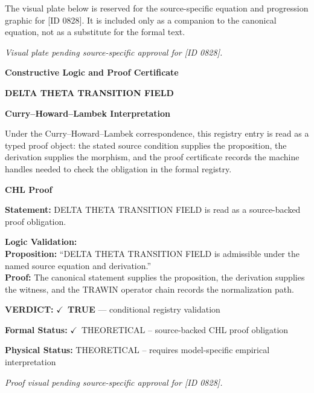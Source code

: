 \begingroup\footnotesize\sloppy
The visual plate below is reserved for the source-specific equation and progression graphic for [ID 0828]. It is included only as a companion to the canonical equation, not as a substitute for the formal text.
\par\endgroup
\begingroup\footnotesize\itshape
Visual plate pending source-specific approval for [ID 0828].
\par\endgroup

\clearpage
\begingroup\tzpsupportsetup
\noindent\textbf{\fontsize{10.8pt}{12.8pt}\selectfont [ID 0828] Constructive Logic and Proof Certificate}\par
\noindent\textbf{\fontsize{10pt}{12pt}\selectfont DELTA THETA TRANSITION FIELD}\par
\vspace{0.45em}
\begingroup
\footnotesize
\setlength{\parskip}{0.22em}
\setlength{\parindent}{0pt}
\noindent\textbf{Curry--Howard--Lambek Interpretation}\par
Under the Curry--Howard--Lambek correspondence, this registry entry is read as a typed proof
object: the stated source condition supplies the proposition, the derivation supplies the
morphism, and the proof certificate records the machine handles needed to check the obligation
in the formal registry.

\vspace{0.45em}
\noindent\textbf{CHL Proof}\par
\textbf{Statement:} DELTA THETA TRANSITION FIELD is read as a source-backed proof obligation.

\textbf{Logic Validation:}\\
\textbf{Proposition:} ``DELTA THETA TRANSITION FIELD is admissible under the named source equation and derivation.''\\
\textbf{Proof:} The canonical statement supplies the proposition, the derivation supplies the witness, and the TRAWIN operator chain records the normalization path.

\textbf{VERDICT:} \ensuremath{\checkmark}\ \textbf{TRUE} --- conditional registry validation

\textbf{Formal Status:} \ensuremath{\checkmark}\ THEORETICAL -- source-backed CHL proof obligation

\textbf{Physical Status:} THEORETICAL -- requires model-specific empirical interpretation
\par\vspace{0.45em}
\par
\vfill
\begingroup\footnotesize\itshape
Proof visual pending source-specific approval for [ID 0828].
\par\endgroup
\vfill
\endgroup
\endgroup
